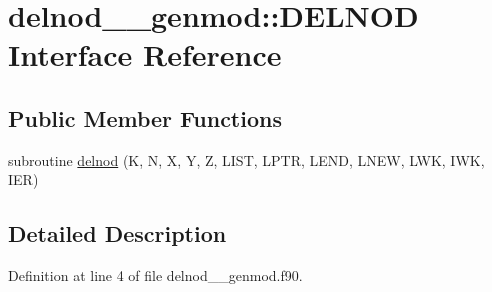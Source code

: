 \hypertarget{interfacedelnod____genmod_1_1DELNOD}{\section{delnod\+\_\+\+\_\+genmod\+:\+:D\+E\+L\+N\+O\+D Interface Reference}
\label{interfacedelnod____genmod_1_1DELNOD}
}
\subsection*{Public Member Functions}
\begin{DoxyCompactItemize}
\item 
subroutine \hyperlink{interfacedelnod____genmod_1_1DELNOD_a5c912c2f1f5c1c776679f6dd9b189422}{delnod} (K, N, X, Y, Z, L\+I\+S\+T, L\+P\+T\+R, L\+E\+N\+D, L\+N\+E\+W, L\+W\+K, I\+W\+K, I\+E\+R)
\end{DoxyCompactItemize}


\subsection{Detailed Description}


Definition at line 4 of file delnod\+\_\+\+\_\+genmod.\+f90.



